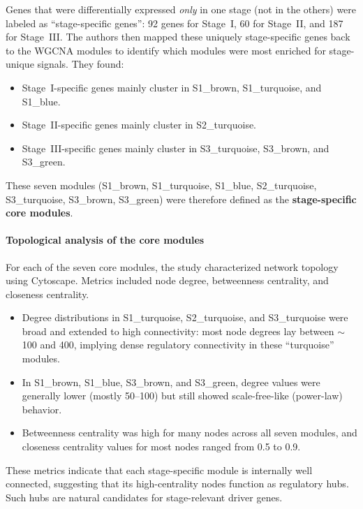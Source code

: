 \documentclass[10pt]{extarticle}
\begin{document}
Genes that were differentially expressed \textit{only} in one stage (not in the others) were labeled as ``stage-specific genes'': 92 genes for Stage~I, 60 for Stage~II, and 187 for Stage~III. The authors then mapped these uniquely stage-specific genes back to the WGCNA modules to identify which modules were most enriched for stage-unique signals. They found:
\begin{itemize}[label=-]
    \item Stage~I-specific genes mainly cluster in S1\_brown, S1\_turquoise, and S1\_blue.
    \item Stage~II-specific genes mainly cluster in S2\_turquoise.
    \item Stage~III-specific genes mainly cluster in S3\_turquoise, S3\_brown, and S3\_green.
\end{itemize}

These seven modules (S1\_brown, S1\_turquoise, S1\_blue, S2\_turquoise, S3\_turquoise, S3\_brown, S3\_green) were therefore defined as the \textbf{stage-specific core modules}.

\paragraph{Topological analysis of the core modules}
For each of the seven core modules, the study characterized network topology using Cytoscape. Metrics included node degree, betweenness centrality, and closeness centrality.

\begin{itemize}[label=-]
    \item Degree distributions in S1\_turquoise, S2\_turquoise, and S3\_turquoise were broad and extended to high connectivity: most node degrees lay between $\sim$100 and 400, implying dense regulatory connectivity in these ``turquoise'' modules.
    \item In S1\_brown, S1\_blue, S3\_brown, and S3\_green, degree values were generally lower (mostly 50--100) but still showed scale-free-like (power-law) behavior.
    \item Betweenness centrality was high for many nodes across all seven modules, and closeness centrality values for most nodes ranged from 0.5 to 0.9.
\end{itemize}

These metrics indicate that each stage-specific module is internally well connected, suggesting that its high-centrality nodes function as regulatory hubs. Such hubs are natural candidates for stage-relevant driver genes.
\end{document}
